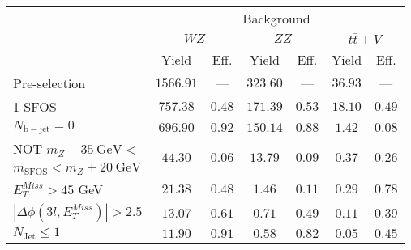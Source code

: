 \begin{tabular}{l||c|c||c|c||c|c}
\hline
 &       \multicolumn{6}{c}{Background}\\
 &  \multicolumn{2}{c||}{$WZ$} & \multicolumn{2}{c||}{$ZZ$} & \multicolumn{2}{c}{$t\bar{t}+V$} \\ 
 & Yield & Eff. & Yield & Eff. & Yield & Eff. \\
\hline\hline
Pre-selection & $1566.91$ & --- &  $323.60$ & --- &  $36.93$ & ---  \\
\hline
1 SFOS &  $757.38$ &  $0.48$ &  $171.39$ &  $0.53$ &  $18.10$ &  $0.49$ \\ 
\hline
$N_{\mathrm{b-jet}} = 0$ &  $696.90$ &  $0.92$ &  $150.14$ &  $0.88$ &  $1.42$ &  $0.08$\\ 
\hline
NOT $m_Z - 35~\mathrm{GeV} <$  &  \multirow{2}{*}{$44.30$} &  \multirow{2}{*}{$0.06$} &  \multirow{2}{*}{$13.79$} &  \multirow{2}{*}{$0.09$} &  \multirow{2}{*}{$0.37$} &  \multirow{2}{*}{$0.26$} \\ 
$ m_{\mathrm{SFOS}} < m_Z + 20~\mathrm{GeV}$ & & & &  & & \\
\hline
$E_{T}^{Miss} > 45$ GeV &  $21.38$ &  $0.48$ &  $1.46$ &  $0.11$ &  $0.29$ &  $0.78$ \\ 
\hline
$|\Delta\phi(3l,E_{T}^{Miss})| > 2.5$ &  $13.07$ &  $0.61$ &  $0.71$ &  $0.49$ &  $0.11$ &  $0.39$ \\ 
\hline
$N_{\mathrm{Jet}} \leq 1$ &  $11.90$ &  $0.91$ &  $0.58$ &  $0.82$ &  $0.05$ &  $0.45$ \\ 
\hline
\end{tabular}
